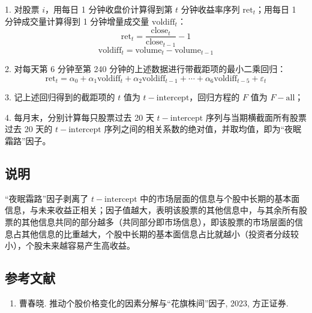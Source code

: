 \documentclass{article}
\begin{document}
1. 对股票 \( i \)，用每日 1 分钟收盘价计算得到第 \( t \) 分钟收益率序列 \( \mathrm{ret}_t \)；用每日 1 分钟成交量计算得到 1 分钟增量成交量 \( \mathrm{voldiff}_t \)：
\begin{equation}
    \mathrm{ret}_t = \frac{\mathrm{close}_t}{\mathrm{close}_{t-1}} - 1
\end{equation}
\begin{equation}
    \mathrm{voldiff}_t = \mathrm{volume}_t - \mathrm{volume}_{t-1}
\end{equation}

2. 对每天第 6 分钟至第 240 分钟的上述数据进行带截距项的最小二乘回归：
\begin{equation}
    \mathrm{ret}_t = \alpha_0 + \alpha_1 \mathrm{voldiff}_t + \alpha_2 \mathrm{voldiff}_{t-1} + \cdots + \alpha_6 \mathrm{voldiff}_{t-5} + \varepsilon_t
\end{equation}

3. 记上述回归得到的截距项的 \( t \) 值为 \( t-{\mathrm{intercept}} \)，回归方程的 \( F \) 值为 \( F-{\mathrm{all}} \)；

4. 每月末，分别计算每只股票过去 20 天 \( t-{\mathrm{intercept}} \) 序列与当期横截面所有股票过去 20 天的 \( t-{\mathrm{intercept}} \) 序列之间的相关系数的绝对值，并取均值，即为“夜眠霜路”因子。

\subsection{说明}
“夜眠霜路”因子剥离了 \( t-{\mathrm{intercept}} \) 中的市场层面的信息与个股中长期的基本面信息，与未来收益正相关；因子值越大，表明该股票的其他信息中，与其余所有股票的其他信息共同的部分越多（共同部分即市场信息），即该股票的市场层面的信息占其他信息的比重越大，个股中长期的基本面信息占比就越小（投资者分歧较小），个股未来越容易产生高收益。

\subsection{参考文献}
\begin{enumerate}
    \item 曹春晓. 推动个股价格变化的因素分解与“花旗株间”因子, 2023, 方正证券.
\end{enumerate}
\end{document}
